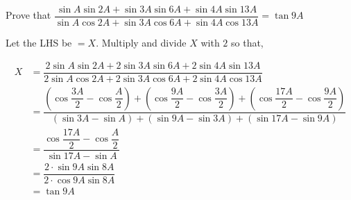 
%
%
%
%
% 
% 

\question[4] Prove that $\dfrac{\sin A\sin 2A + \sin 3A\sin 6A + \sin 4A\sin 13A}
{\sin A\cos 2A + \sin 3A\cos 6A + \sin 4A\cos 13A} = \tan 9A$


\ifprintanswers
\fi 

\begin{solution}[\fullpage]
   Let the LHS be $= X$. Multiply and divide $X$ with $2$ so that, 
   \begin{fullwidth}
   	  \begin{align}
   	      X &= \dfrac{2\sin A\sin 2A + 2\sin 3A\sin 6A + 2\sin 4A\sin 13A}
{2\sin A\cos 2A + 2\sin 3A\cos 6A + 2\sin 4A\cos 13A} \\
            &= \dfrac{(\cos\dfrac{3A}{2} - \cos\dfrac{A}{2}) + 
            (\cos\dfrac{9A}{2} - \cos\dfrac{3A}{2}) + 
            (\cos\dfrac{17A}{2} - \cos\dfrac{9A}{2})}
                     {(\sin 3A - \sin A) + 
                     (\sin 9A - \sin 3A) + 
                     (\sin 17A - \sin 9A)} \\
            &= \dfrac{\cos\dfrac{17A}{2} - \cos\dfrac{A}{2}}{\sin 17A - \sin A} \\
            &= \dfrac{2\cdot\sin 9A\sin 8A}{2\cdot\cos 9A\sin 8A} \\
            &= \tan 9A
   	  \end{align}
   \end{fullwidth}
\end{solution}

